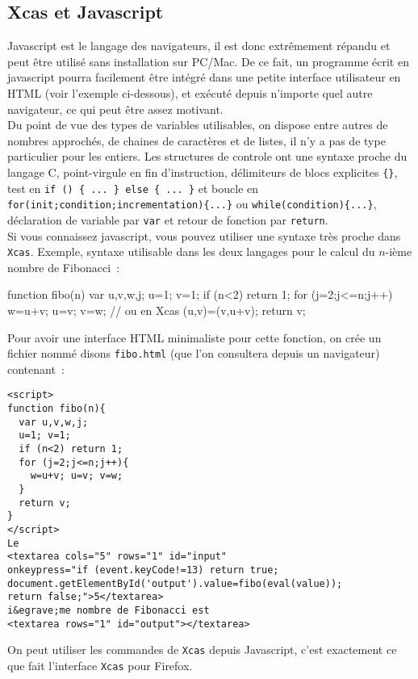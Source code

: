 \documentclass[12pt,a4paper]{book}
\begin{document}
\begin{giacjshere}
\section{Xcas et Javascript}
Javascript est le langage des navigateurs, il est donc
extr\^emement r\'epandu et peut \^etre utilis\'e
sans installation sur PC/Mac. De ce fait, un programme
\'ecrit en javascript pourra facilement 
\^etre int\'egr\'e dans une petite interface
utilisateur en HTML (voir l'exemple ci-dessous), 
et ex\'ecut\'e depuis n'importe
quel autre navigateur, ce qui peut \^etre assez 
motivant. \\
Du point de vue des types
de variables utilisables, on dispose entre autres
de nombres approch\'es,
de chaines de caract\`eres et de listes, il n'y a pas de type
particulier pour les entiers. Les structures de controle ont une
syntaxe proche du langage C, point-virgule en fin d'instruction,
d\'elimiteurs de blocs explicites \verb|{}|,  test en 
\verb|if () { ... } else { ... }| et boucle en
\verb|for(init;condition;incrementation){...}| 
ou \verb|while(condition){...}|, d\'eclaration de variable
par \verb|var| et retour de fonction par \verb|return|. \\
Si vous connaissez javascript, vous pouvez utiliser une syntaxe tr\`es
proche dans {\tt Xcas}. Exemple, syntaxe utilisable dans les
deux langages pour le calcul du $n$-i\`eme nombre de Fibonacci~:
\begin{giacprog}
function fibo(n){
  var u,v,w,j;
  u=1; v=1;
  if (n<2) return 1;
  for (j=2;j<=n;j++){
    w=u+v; u=v; v=w; // ou en Xcas (u,v)=(v,u+v);
  }
  return v;
}
\end{giacprog}
Pour avoir une interface HTML minimaliste pour cette fonction,
on cr\'ee un fichier nomm\'e disons \verb|fibo.html| (que l'on
consultera depuis un navigateur) contenant~:
\begin{verbatim}
<script>
function fibo(n){
  var u,v,w,j;
  u=1; v=1;
  if (n<2) return 1;
  for (j=2;j<=n;j++){
    w=u+v; u=v; v=w; 
  }
  return v;
}
</script>
Le 
<textarea cols="5" rows="1" id="input" 
onkeypress="if (event.keyCode!=13) return true; 
document.getElementById('output').value=fibo(eval(value)); 
return false;">5</textarea>
i&egrave;me nombre de Fibonacci est
<textarea rows="1" id="output"></textarea>
\end{verbatim}
On peut utiliser les commandes de {\tt Xcas} depuis Javascript, c'est exactement
ce que fait l'interface {\tt Xcas} pour Firefox.


\end{giacjshere}
\end{document}
